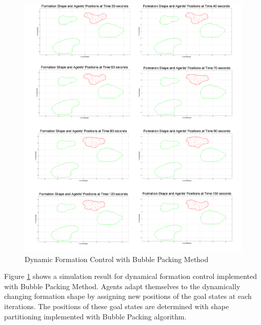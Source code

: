 \begin{figure}[H]
\caption{Dynamic Formation Control with Bubble Packing Method} \label{multiple1_ref}
\centerline{\includegraphics[scale = 0.16]{multiple1}}
\end{figure} 

Figure \ref{multiple1_ref} shows a simulation result for dynamical formation control implemented with Bubble Packing Method. Agents adapt themselves to the dynamically changing formation shape by assigning new positions of the goal states at each iterations. The positions of these goal states are determined with shape partitioning implemented with Bubble Packing algorithm. 

